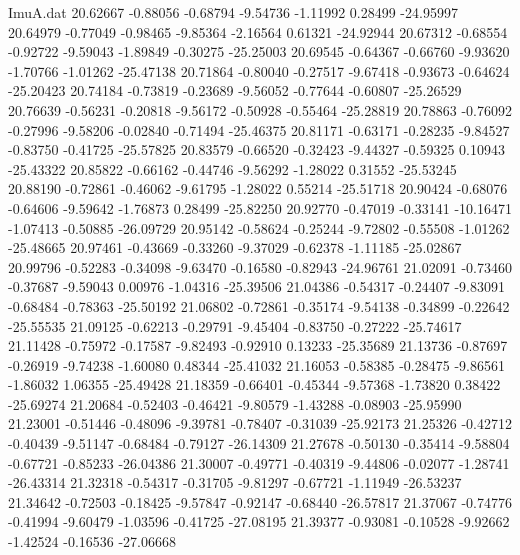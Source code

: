 \begin{filecontents}{ImuA.dat}
  20.62667   -0.88056   -0.68794   -9.54736   -1.11992    0.28499  -24.95997
  20.64979   -0.77049   -0.98465   -9.85364   -2.16564    0.61321  -24.92944
  20.67312   -0.68554   -0.92722   -9.59043   -1.89849   -0.30275  -25.25003
  20.69545   -0.64367   -0.66760   -9.93620   -1.70766   -1.01262  -25.47138
  20.71864   -0.80040   -0.27517   -9.67418   -0.93673   -0.64624  -25.20423
  20.74184   -0.73819   -0.23689   -9.56052   -0.77644   -0.60807  -25.26529
  20.76639   -0.56231   -0.20818   -9.56172   -0.50928   -0.55464  -25.28819
  20.78863   -0.76092   -0.27996   -9.58206   -0.02840   -0.71494  -25.46375
  20.81171   -0.63171   -0.28235   -9.84527   -0.83750   -0.41725  -25.57825
  20.83579   -0.66520   -0.32423   -9.44327   -0.59325    0.10943  -25.43322
  20.85822   -0.66162   -0.44746   -9.56292   -1.28022    0.31552  -25.53245
  20.88190   -0.72861   -0.46062   -9.61795   -1.28022    0.55214  -25.51718
  20.90424   -0.68076   -0.64606   -9.59642   -1.76873    0.28499  -25.82250
  20.92770   -0.47019   -0.33141  -10.16471   -1.07413   -0.50885  -26.09729
  20.95142   -0.58624   -0.25244   -9.72802   -0.55508   -1.01262  -25.48665
  20.97461   -0.43669   -0.33260   -9.37029   -0.62378   -1.11185  -25.02867
  20.99796   -0.52283   -0.34098   -9.63470   -0.16580   -0.82943  -24.96761
  21.02091   -0.73460   -0.37687   -9.59043    0.00976   -1.04316  -25.39506
  21.04386   -0.54317   -0.24407   -9.83091   -0.68484   -0.78363  -25.50192
  21.06802   -0.72861   -0.35174   -9.54138   -0.34899   -0.22642  -25.55535
  21.09125   -0.62213   -0.29791   -9.45404   -0.83750   -0.27222  -25.74617
  21.11428   -0.75972   -0.17587   -9.82493   -0.92910    0.13233  -25.35689
  21.13736   -0.87697   -0.26919   -9.74238   -1.60080    0.48344  -25.41032
  21.16053   -0.58385   -0.28475   -9.86561   -1.86032    1.06355  -25.49428
  21.18359   -0.66401   -0.45344   -9.57368   -1.73820    0.38422  -25.69274
  21.20684   -0.52403   -0.46421   -9.80579   -1.43288   -0.08903  -25.95990
  21.23001   -0.51446   -0.48096   -9.39781   -0.78407   -0.31039  -25.92173
  21.25326   -0.42712   -0.40439   -9.51147   -0.68484   -0.79127  -26.14309
  21.27678   -0.50130   -0.35414   -9.58804   -0.67721   -0.85233  -26.04386
  21.30007   -0.49771   -0.40319   -9.44806   -0.02077   -1.28741  -26.43314
  21.32318   -0.54317   -0.31705   -9.81297   -0.67721   -1.11949  -26.53237
  21.34642   -0.72503   -0.18425   -9.57847   -0.92147   -0.68440  -26.57817
  21.37067   -0.74776   -0.41994   -9.60479   -1.03596   -0.41725  -27.08195
  21.39377   -0.93081   -0.10528   -9.92662   -1.42524   -0.16536  -27.06668

\end{filecontents}
